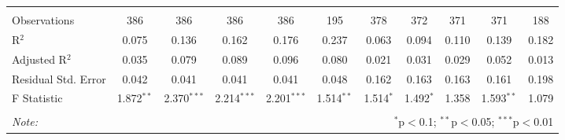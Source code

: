 \begin{table}[H]
\begin{tabular}{@{\extracolsep{4pt}}lcccccccccc}
  & & & & & & & & & & \\ 
\hline \\[-1.8ex] 
Observations & 386 & 386 & 386 & 386 & 195 & 378 & 372 & 371 & 371 & 188 \\ 
R$^{2}$ & 0.075 & 0.136 & 0.162 & 0.176 & 0.237 & 0.063 & 0.094 & 0.110 & 0.139 & 0.182 \\ 
Adjusted R$^{2}$ & 0.035 & 0.079 & 0.089 & 0.096 & 0.080 & 0.021 & 0.031 & 0.029 & 0.052 & 0.013 \\ 
Residual Std. Error & 0.042 & 0.041 & 0.041 & 0.041 & 0.048 & 0.162 & 0.163 & 0.163 & 0.161 & 0.198 \\ 
F Statistic & 1.872$^{**}$ & 2.370$^{***}$ & 2.214$^{***}$ & 2.201$^{***}$ & 1.514$^{**}$ & 1.514$^{*}$ & 1.492$^{*}$ & 1.358 & 1.593$^{**}$ & 1.079 \\ 
\hline 
\hline \\[-1.8ex] 
\textit{Note:}  & \multicolumn{10}{r}{$^{*}$p$<$0.1; $^{**}$p$<$0.05; $^{***}$p$<$0.01} \\ 
\end{tabular} 
\end{table} 
